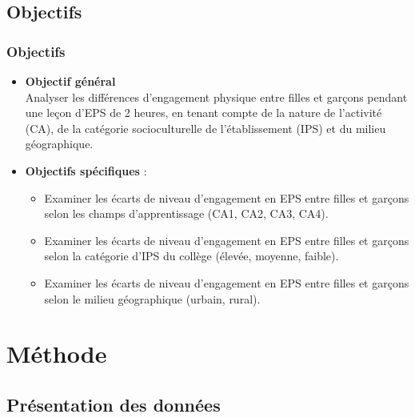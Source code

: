 \documentclass{beamer}
\begin{document}
	\subsection{Objectifs}
\begin{frame}
	\frametitle{Objectifs} 
	\begin{itemize}
		\item \textbf{Objectif général} \\
		Analyser les différences d'engagement physique entre filles et garçons pendant une leçon d'EPS de 2 heures, en tenant compte de la nature de l'activité (CA), de la catégorie socioculturelle de l'établissement (IPS) et du milieu géographique.
		\vfill
		\pause
		\item \textbf{Objectifs spécifiques} :
		\begin{itemize}
			\item Examiner les écarts de niveau d'engagement en EPS entre filles et garçons selon les champs d'apprentissage (CA1, CA2, CA3, CA4).
			\item Examiner les écarts de niveau d'engagement en EPS entre filles et garçons selon la catégorie d’IPS du collège (élevée, moyenne, faible).
			\item Examiner les écarts de niveau d'engagement en EPS entre filles et garçons selon le milieu géographique (urbain, rural).
		\end{itemize}
	\end{itemize}
\end{frame}


	\section{Méthode}
	\begin{frame}
		\tableofcontents[sections={2}]
	\end{frame}
	\subsection{Présentation des données}
		
\end{document}

